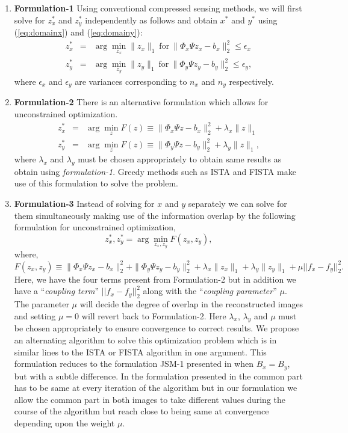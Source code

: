 \begin{enumerate}
\item \textbf{Formulation-1} 
Using conventional compressed sensing methods, we will first solve for $z_x^*$ and $z_y^*$ independently  as follows and obtain $x^*$ and $y^*$ using (\ref{eq:domainx}) and  (\ref{eq:domainy}):
\begin{eqnarray}
 z_x^* &=&  \arg \min_{z_x} \| z_x \|_1 \ \text{for} \ \|\Phi_x \Psi z_x -b_x\|_2^2 \leq \epsilon_x \\
 z_y^* &=&  \arg \min_{z_y} \| z_y \|_1 \ \text{for} \ \|\Phi_y \Psi z_y -b_y\|_2^2 \leq \epsilon_y,
 \label{form1}
\end{eqnarray}
where $\epsilon_x$ and $\epsilon_y$ are variances corresponding to $n_x$ and $n_y$ respectively.
\item \textbf{Formulation-2} There is an alternative formulation which allows for unconstrained optimization.
\begin{eqnarray}
 z_x^* &=& \arg \min_z F(z) \equiv \|\Phi_x\Psi z - b_x\|_2^2 + \lambda_x \|z\|_1\\
 z_y^* &=& \arg \min_z F(z) \equiv \|\Phi_y\Psi z - b_y\|_2^2 + \lambda_y \|z\|_1,
\label{form2}
 \end{eqnarray}
where $\lambda_x$ and $\lambda_y$ must be chosen appropriately to obtain same results as obtain using \emph{formulation-1}.
Greedy methods such as ISTA and FISTA make use of this formulation to solve the problem.
\item \textbf{Formulation-3} Instead of solving for $x$ and $y$ separately we can solve for them simultaneously making use of the information overlap by the following formulation for unconstrained optimization,
 \begin{equation}
 z_x^*, z_y^* = \arg \min_{z_x, z_y} F(z_x, z_y),
 \end{equation}
where,
 \begin{equation}
 F(z_x, z_y) \equiv \|\Phi_x\Psi z_x - b_x\|_2^2 + \|\Phi_y\Psi z_y - b_y\|_2^2 + \lambda_x \|z_x\|_1 + \lambda_y \|z_y\|_1 + \mu ||f_x - f_y||_2^2.
 \label{eq:formu}
 \end{equation}
Here, we have the four terms present from Formulation-2 but in addition we have a ``\emph{coupling term}''  $||f_x - f_y||_2^2$ along with the ``\emph{coupling parameter}'' $\mu$. The parameter $\mu$ will decide the degree of overlap in the reconstructed images and setting $\mu = 0$ will revert back to Formulation-2.
Here $\lambda_x$, $\lambda_y$ and $\mu$ must be chosen appropriately to ensure convergence to correct results. We propose an alternating algorithm to solve this optimization problem which is in similar lines to the ISTA or FISTA algorithm in one argument.
This formulation reduces to the formulation JSM-1 presented in \cite{JSM} when $B_x = B_y$, but with a subtle difference.  In the formulation presented in \cite{JSM} the common part has to be same at every iteration of the algorithm but in our formulation we allow the common part in both images to take different values during the course of the algorithm but reach close to being same at convergence depending upon the weight $\mu$.

\end{enumerate}
